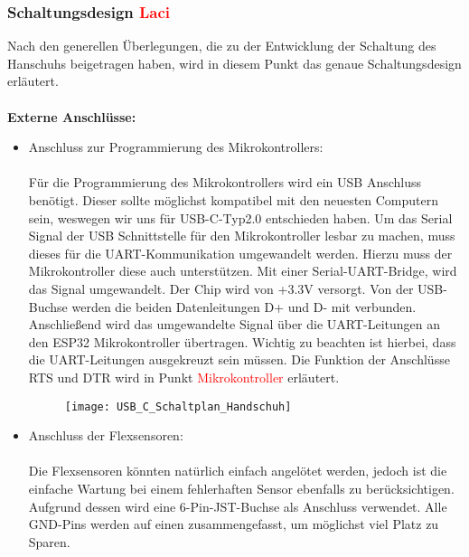 \documentclass[11pt]{article}
\begin{document}
\subsubsection{Schaltungsdesign \textcolor{red}{Laci}}
Nach den generellen Überlegungen, die zu der Entwicklung der Schaltung des Hanschuhs beigetragen haben, wird in diesem Punkt 
das genaue Schaltungsdesign erläutert. \\
\\
\textbf{Externe Anschlüsse:}
\begin{itemize}
	\item Anschluss zur Programmierung des Mikrokontrollers: \\
		  \\
		  Für die Programmierung des Mikrokontrollers wird ein USB Anschluss benötigt. Dieser sollte möglichst kompatibel mit
		  den neuesten Computern sein, weswegen wir uns für USB-C-Typ2.0 entschieden haben. Um das Serial Signal der USB Schnittstelle
		  für den Mikrokontroller lesbar zu machen, muss dieses für die UART-Kommunikation umgewandelt werden. Hierzu muss der Mikrokontroller
		  diese auch unterstützen. Mit einer Serial-UART-Bridge, wird das Signal umgewandelt. Der Chip wird von +3.3V versorgt.
		  Von der USB-Buchse werden die beiden Datenleitungen D+ und D- mit verbunden. Anschließend wird das umgewandelte Signal 
		  über die UART-Leitungen an den ESP32 Mikrokontroller übertragen. Wichtig zu beachten ist hierbei, dass die UART-Leitungen
		  ausgekreuzt sein müssen. Die Funktion der Anschlüsse RTS und DTR wird in Punkt \textcolor{red}{Mikrokontroller} erläutert. \\
		  \begin{figure}[H]
			\begin{center}
				\scalebox{0.5}
				{\texttt{[image: USB\_C\_Schaltplan\_Handschuh]}}
			\end{center}
		\end{figure}
	\item Anschluss der Flexsensoren: \\
		  \\
		  Die Flexsensoren könnten natürlich einfach angelötet werden, jedoch ist die einfache Wartung bei einem fehlerhaften
		  Sensor ebenfalls zu berücksichtigen. Aufgrund dessen wird eine 6-Pin-JST-Buchse als Anschluss verwendet. Alle GND-Pins
		  werden auf einen zusammengefasst, um möglichst viel Platz zu Sparen. \\
		  \begin{figure}[H]

\end{figure}
\end{itemize}
\end{document}
